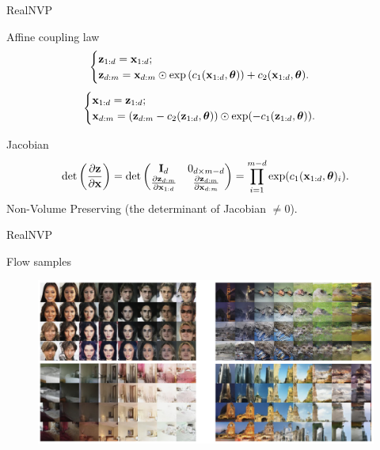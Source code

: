 \begin{frame}{RealNVP}
	\begin{block}{Affine coupling law}
		\[
			\begin{cases} \mathbf{z}_{1:d} = \mathbf{x}_{1:d}; \\ \mathbf{z}_{d:m} = \mathbf{x}_{d:m} \odot \exp \left(c_1(\mathbf{x}_{1:d}, \boldsymbol{\theta})\right) + c_2(\mathbf{x}_{1:d}, \boldsymbol{\theta}).\end{cases} 
		\]
		\[
			\begin{cases} \mathbf{x}_{1:d} = \mathbf{z}_{1:d}; \\ \mathbf{x}_{d:m} = \left(\mathbf{z}_{d:m} - c_2(\mathbf{z}_{1:d}, \boldsymbol{\theta}) \right) \odot \exp(-c_1(\mathbf{z}_{1:d}, \boldsymbol{\theta})).\end{cases}
		\]
	\end{block}
	\begin{block}{Jacobian}
		\vspace{-0.5cm}
		\[
		\det \left( \frac{\partial \mathbf{z}}{\partial \mathbf{x}} \right) = \det 
		\begin{pmatrix}
			\mathbf{I}_d & 0_{d \times m - d} \\
			\frac{\partial \mathbf{z}_{d:m}}{\partial \mathbf{x}_{1:d}} & \frac{\partial \mathbf{z}_{d:m}}{\partial \mathbf{x}_{d:m}}
		\end{pmatrix} = \prod_{i=1}^{m - d} \exp (c_1(\mathbf{x}_{1:d}, \boldsymbol{\theta})_i).
		\]
		Non-Volume Preserving (the determinant of Jacobian $\neq 0$).
	\end{block}
	
\end{frame}
\begin{frame}{RealNVP}
	\begin{block}{Flow samples}
		\begin{figure}
			\centering
			\includegraphics[width=\linewidth]{figs/realnvp_output.png}
		\end{figure}
	\end{block}
\end{frame}
